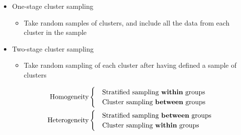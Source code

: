 \documentclass[../notes_compiled.tex]{subfiles}
\begin{document}
\begin{itemize}
\begin{itemize}
\item One-stage cluster sampling
\begin{itemize}
\item Take random samples of clusters, and include all the data from each cluster in the sample
\end{itemize}
\item Two-stage cluster sampling
\begin{itemize}
\item Take random sampling of each cluster after having defined a sample of clusters
\end{itemize}
\begin{align*}
\text{Homogeneity} & \begin{cases}&\text{Stratified sampling \textbf{within} groups} \\ &\text{Cluster sampling \textbf{between} groups} \end{cases}\\
\text{Heterogeneity} & \begin{cases}&\text{Stratified sampling \textbf{between} groups} \\ &\text{Cluster sampling \textbf{within} groups} \end{cases}
\end{align*}
\end{itemize}
\end{itemize}
\end{document}

